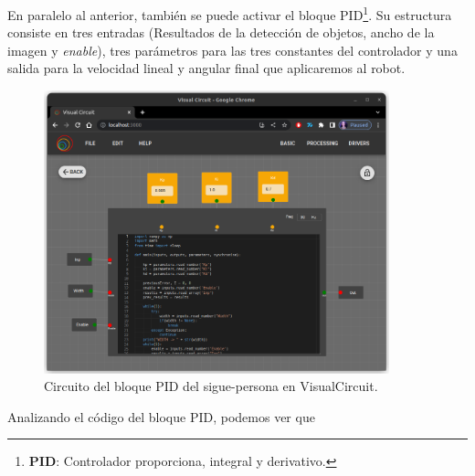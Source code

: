 En paralelo al anterior, también se puede activar el bloque PID\footnote{\textbf{PID}: Controlador proporciona, integral y derivativo.}. Su estructura consiste en tres entradas (Resultados de la detección de objetos, ancho de la imagen y \textit{enable}), tres parámetros para las tres constantes del controlador y una salida para la velocidad lineal y angular final que aplicaremos al robot.

\begin{figure} [H]
    \begin{center}
        \includegraphics[width=10cm]{figs/c5/PID_follow_person.png}
    \end{center}
    \caption[Circuito del bloque PID sigue-persona]{Circuito del bloque PID del sigue-persona en VisualCircuit.}
    \label{fig:initial_follow_person}
\end{figure}

Analizando el código del bloque PID, podemos ver que 

